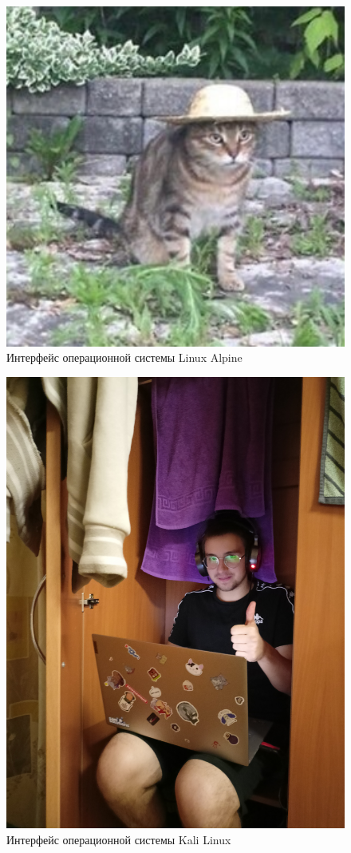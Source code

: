\begin{figure}[H]
  \centering
  \includegraphics[width=1\textwidth]{image/6.png}
  \caption{Интерфейс операционной системы Linux Alpine}
  \label{Linux2}
\end{figure}
\begin{figure}[H]
  \centering
  \includegraphics[width=1\textwidth]{image/7.jpg}
  \caption{Интерфейс операционной системы Kali Linux}
  \label{Kali}
\end{figure}

